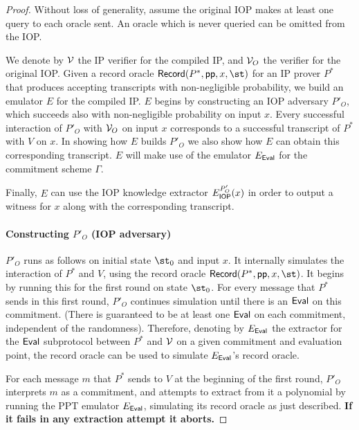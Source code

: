 \begin{proof}
Without loss of generality, assume the original IOP makes at least one query to each oracle sent. An oracle which is never queried can be omitted from the IOP.

We denote by $\mathcal{V}$ the IP verifier for the compiled IP, and $\mathcal{V}_{O}$ the verifier for the original IOP. 
Given a record oracle $\pro{Record}(P^*, \params, x, \st)$ for an IP prover $P^*$ that produces accepting transcripts with non-negligible probability, we build an emulator $E$ for the compiled IP. $E$ begins by constructing an IOP adversary $P'_{O}$, which succeeds also with non-negligible probability on input $x$. Every successful interaction of $P'_{O}$ with $\mathcal{V}_{O}$ on input $x$ corresponds to a successful transcript of $P^*$ with $V$ on $x$. In showing how $E$ builds $P'_{O}$ we also show how $E$ can obtain this corresponding transcript. $E$ will make use of the emulator $E_\textsf{{Eval}}$ for the commitment scheme $\Gamma$. %

Finally, $E$ can use the IOP knowledge extractor $E_{\textsf{{IOP}}}^{P'_O}(x)$ in order to output a witness for $x$ along with the corresponding transcript. 

\paragraph{Constructing $P'_O$ (IOP adversary)}
$P'_O$ runs as follows on initial state $\st_0$ and input $x$. It internally simulates the interaction of $P^*$ and $V$, using the record oracle $\pro{Record}(P^*, \params, x, \st)$. It begins by running this for the first round on state $\st_0$. For every message that $P^*$ sends in this first round, $P'_O$ continues simulation until there is an $\textsf{{Eval}}$ on this commitment. (There is guaranteed to be at least one $\textsf{{Eval}}$ on each commitment, independent of the randomness). Therefore, denoting by $E_\textsf{{Eval}}$ the extractor for the $\textsf{{Eval}}$ subprotocol between $P^*$ and $\mathcal{V}$ on a given commitment and evaluation point, the record oracle can be used to simulate $E_\textsf{{Eval}}$'s record oracle.%

For each message $m$ that $P^*$ sends to $V$ at the beginning of the first round, $P'_O$ interprets $m$ as a commitment, and attempts to extract from it a polynomial by 
running the PPT emulator $E_\textsf{{Eval}}$, simulating its record oracle as just described. \textbf{If it fails in any extraction attempt it aborts.} 


\end{proof}

